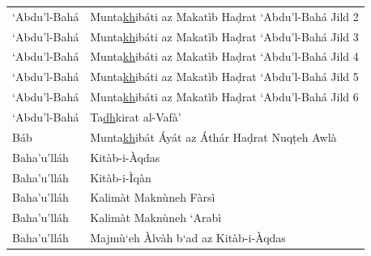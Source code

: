 \documentclass[12pt, oneside]{report}
\begin{document}
\begin{appendix}
\begin{table}[ht]
\begin{tabular}{ll}
	`Abdu'l-Bah\'{a}	& Munta\underline{kh}ib\'{a}ti az Makat\`{i}b Ha\d{d}rat `Abdu'l-Bah\'{a} Jild 2 \\
	`Abdu'l-Bah\'{a}	& Munta\underline{kh}ib\'{a}ti az Makat\`{i}b Ha\d{d}rat `Abdu'l-Bah\'{a} Jild 3 \\
	`Abdu'l-Bah\'{a}	& Munta\underline{kh}ib\'{a}ti az Makat\`{i}b Ha\d{d}rat `Abdu'l-Bah\'{a} Jild 4 \\
	`Abdu'l-Bah\'{a}	& Munta\underline{kh}ib\'{a}ti az Makat\`{i}b Ha\d{d}rat `Abdu'l-Bah\'{a} Jild 5 \\
	`Abdu'l-Bah\'{a}	& Munta\underline{kh}ib\'{a}ti az Makat\`{i}b Ha\d{d}rat `Abdu'l-Bah\'{a} Jild 6 \\
	`Abdu'l-Bah\'{a}	& Ta\underline{dh}kirat al-Vaf\`{a}' \\
	B\'{a}b & Munta\underline{kh}ib\'{a}t \'{A}y\'{a}t az \'{A}th\'{a}r Ha\d{d}rat Nuq\d{t}eh Awl\`{a} \\
	Baha'u'll\'{a}h & Kit\`{a}b-i-\`{A}qdas \\
	Baha'u'll\'{a}h & Kit\`{a}b-i-\`{I}q\`{a}n \\
	Baha'u'll\'{a}h & Kalim\`{a}t Makn\`{u}neh F\`{a}rs\`{i} \\
	Baha'u'll\'{a}h & Kalim\`{a}t Makn\`{u}neh `Arab\`{i} \\
	Baha'u'll\'{a}h & Majm\`{u}`eh \`{A}lv\`{a}h b`ad az Kit\`{a}b-i-\`{A}qdas \\
	
	\end{tabular}
\end{table}	
\end{appendix}
\singlespacing
\printbibliography
\end{document}
